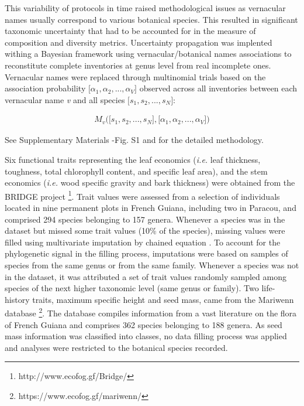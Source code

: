\documentclass[fleqn,10pt]{ArtEcoFoG} %
\theoremstyle{definition}
\theoremstyle{definition}
\theoremstyle{definition}
\theoremstyle{remark}
\begin{document}
This variability of protocols in time raised methodological issues as
vernacular names usually correspond to various botanical species. This
resulted in significant taxonomic uncertainty that had to be accounted
for in the measure of composition and diversity metrics. Uncertainty
propagation was implented withing a Bayesian framework using
vernacular/botanical names associations to reconstitute complete
inventories at genus level from real incomplete ones. Vernacular names
were replaced through multinomial trials based on the association
probability \(\big[\alpha_1, \alpha_2,..., \alpha_V\big]\) observed
across all inventories between each vernacular name \emph{v} and all
species \(\big[s_1, s_2,..., s_N\big]\):

\begin{align}
M_v\Big(\big[s_1, s_2,..., s_N\big],\big[\alpha_1, \alpha_2,..., \alpha_V\big]\Big) \nonumber
\end{align}

See Supplementary Materials -Fig. S1 and \citet{Aubry-Kientz2013} for
the detailed methodology.

Six functional traits representing the leaf economics (\emph{i.e.} leaf
thickness, toughness, total chlorophyll content, and specific leaf
area), and the stem economics (\emph{i.e.} wood specific gravity and
bark thickness) were obtained from the BRIDGE project \footnote{http://www.ecofog.gf/Bridge/}.
Trait values were assessed from a selection of individuals located in
nine permanent plots in French Guiana, including two in Paracou, and
comprised 294 species belonging to 157 genera. Whenever a species was in
the dataset but missed some trait values (10\% of the species), missing
values were filled using multivariate imputation by chained equation
\citep{Mice2011}. To account for the phylogenetic signal in the filling
process, imputations were based on samples of species from the same
genus or from the same family. Whenever a species was not in the
dataset, it was attributed a set of trait values randomly sampled among
species of the next higher taxonomic level (same genus or family). Two
life-history traits, maximum specific height and seed mass, came from
the Mariwenn database \footnote{https://www.ecofog.gf/mariwenn/}. The
database compiles information from a vast literature on the flora of
French Guiana \citep{Ollivier2007} and comprises 362 species belonging
to 188 genera. As seed mass information was classified into classes, no
data filling process was applied and analyses were restricted to the
botanical species recorded.
\end{document}
